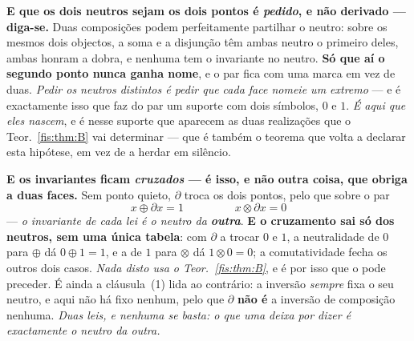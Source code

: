 \documentclass[livro.tex]{subfiles}
\begin{document}
\begin{teorema}
\begin{enumerate}
\smallskip\noindent\textbf{E que os dois neutros sejam os dois pontos é
\emph{pedido}, e não derivado --- diga-se.} Duas composições podem
perfeitamente partilhar o neutro: sobre os mesmos dois objectos, a soma e a
disjunção têm ambas neutro o primeiro deles, ambas honram a dobra, e nenhuma tem
o invariante no neutro. \textbf{Só que aí o segundo ponto nunca ganha nome}, e o
par fica com uma marca em vez de duas. \emph{Pedir os neutros distintos é pedir
que cada face nomeie um extremo} --- e é exactamente isso que faz do par um
suporte com dois símbolos, $0$ e $1$. \emph{É aqui que eles nascem}, e é nesse
suporte que aparecem as duas realizações que o Teor.~\ref{fis:thm:B} vai
determinar --- que é também o teorema que volta a declarar esta hipótese, em vez
de a herdar em silêncio.

\smallskip\noindent\textbf{E os invariantes ficam \emph{cruzados} --- é isso, e
não outra coisa, que obriga a duas faces.} Sem ponto quieto, $\partial$ troca os
dois pontos, pelo que sobre o par
\[
\boxed{\;x\oplus\partial x=1\;}\qquad\qquad\boxed{\;x\otimes\partial x=0\;}
\]
--- \emph{o invariante de cada lei é o neutro da \textbf{outra}}. \textbf{E o
cruzamento sai só dos neutros, sem uma única tabela}: com $\partial$ a trocar
$0$ e $1$, a neutralidade de $0$ para $\oplus$ dá $0\oplus1=1$, e a de $1$ para
$\otimes$ dá $1\otimes0=0$; a comutatividade fecha os outros dois casos.
\emph{Nada disto usa o Teor.~\ref{fis:thm:B}}, e é por isso que o pode preceder.
É ainda a cláusula~(1) lida ao contrário: a inversão \emph{sempre} fixa o seu
neutro, e aqui não há fixo nenhum, pelo que $\partial$ \textbf{não é} a inversão
de composição nenhuma. \emph{Duas leis, e nenhuma se basta: o que uma deixa por
dizer é exactamente o neutro da outra.}


\end{enumerate}
\end{teorema}
\end{document}
